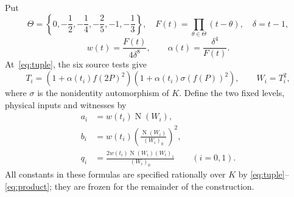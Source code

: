 \documentclass[11pt,a4paper]{article}
\DeclareMathOperator{\N}{N}
\begin{document}
Put
\[
 \Theta=\left\{0,-\frac12,-\frac14,-\frac25,-1,-\frac13\right\},
 \quad F(t)=\prod_{\theta\in\Theta}(t-\theta),\quad\delta=t-1,
\]
\[
 w(t)=\frac{F(t)}{4\delta^8},\qquad
 \alpha(t)=\frac{\delta^4}{F(t)}.
\]
At~\eqref{eq:tuple}, the six source tests give
\begin{equation}\label{eq:product}
 T_i=(1+\alpha(t_i)f(2P)^2)
       (1+\alpha(t_i)\sigma(f(P))^2),\qquad W_i=T_i^2,
\end{equation}
where $\sigma$ is the nonidentity automorphism of $K$. Define the two
fixed levels, physical inputs and witnesses by
\begin{equation}\label{eq:levels}
 \begin{split}
 a_i&=w(t_i)\N(W_i),\\
 b_i&=w(t_i)\left(\frac{\N(W_i)}{(W_i)_0}\right)^2,\\
 q_i&=\frac{2w(t_i)\N(W_i)(W_i)_1}{(W_i)_0}\qquad(i=0,1).
 \end{split}
\end{equation}
All constants in these formulas are specified rationally over $K$ by
\eqref{eq:tuple}--\eqref{eq:product}; they are frozen for the remainder
of the construction.
\end{document}
